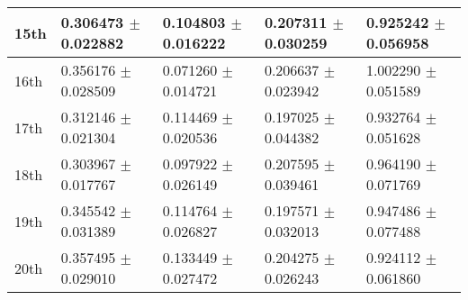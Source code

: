 \begin{knitrout}
\begin{tabular}{l|l|l|l|l}
\hline
15th & 0.306473 $\pm$ 0.022882 & 0.104803 $\pm$ 0.016222 & 0.207311 $\pm$ 0.030259 & 0.925242 $\pm$ 0.056958\\
\hline
16th & 0.356176 $\pm$ 0.028509 & 0.071260 $\pm$ 0.014721 & 0.206637 $\pm$ 0.023942 & 1.002290 $\pm$ 0.051589\\
\hline
17th & 0.312146 $\pm$ 0.021304 & 0.114469 $\pm$ 0.020536 & 0.197025 $\pm$ 0.044382 & 0.932764 $\pm$ 0.051628\\
\hline
18th & 0.303967 $\pm$ 0.017767 & 0.097922 $\pm$ 0.026149 & 0.207595 $\pm$ 0.039461 & 0.964190 $\pm$ 0.071769\\
\hline
19th & 0.345542 $\pm$ 0.031389 & 0.114764 $\pm$ 0.026827 & 0.197571 $\pm$ 0.032013 & 0.947486 $\pm$ 0.077488\\
\hline
20th & 0.357495 $\pm$ 0.029010 & 0.133449 $\pm$ 0.027472 & 0.204275 $\pm$ 0.026243 & 0.924112 $\pm$ 0.061860\\
\hline
\end{tabular}


\end{knitrout}

